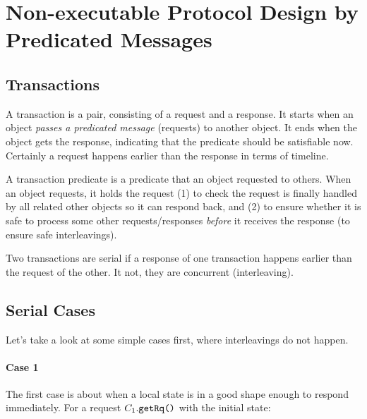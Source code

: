 \documentclass[format=manuscript]{acmart}
\begin{document}
\section{Non-executable Protocol Design by Predicated Messages}

\subsection{Transactions}

\begin{definition}[Transaction]
  A transaction is a pair, consisting of a request and a response. It starts
  when an object \emph{passes a predicated message} (requests) to another
  object. It ends when the object gets the response, indicating that the
  predicate should be satisfiable now. Certainly a request happens earlier than
  the response in terms of timeline.
\end{definition}

\begin{definition}
  A transaction predicate is a predicate that an object requested to
  others. When an object requests, it holds the request (1) to check the request
  is finally handled by all related other objects so it can respond back, and
  (2) to ensure whether it is safe to process some other requests/responses
  \emph{before} it receives the response (to ensure safe interleavings).
\end{definition}

\begin{definition}
  Two transactions are serial if a response of one transaction happens earlier
  than the request of the other. It not, they are concurrent (interleaving).
\end{definition}

\subsection{Serial Cases}\label{serial-cases}

Let's take a look at some simple cases first, where interleavings do not happen.

\paragraph{Case 1}
The first case is about when a local state is in a good shape enough to respond
immediately. For a request $C_1.\texttt{getRq()}$ with the initial state:
\end{document}
